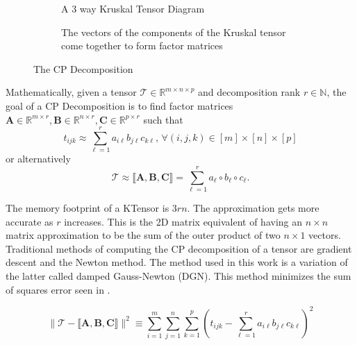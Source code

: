     \begin{figure}[ht!]
        \centering
        \begin{subfigure}[b]{0.99\textwidth}
            \centering
            
            \caption{A 3 way Kruskal Tensor Diagram}
            \label{fig:KTensor}
        \end{subfigure}
        
        \vspace{1em}
        \begin{subfigure}[b]{0.99\textwidth}
            \centering
            
            \caption[Kruskal Tensor Factor Matrices]{The vectors of the components of the Kruskal tensor come together to form factor matrices}
            \label{fig:KTensor_factor_matrices}
        \end{subfigure}
        \caption[The CP Decomposition]{The CP Decomposition}
    \end{figure}

    Mathematically, given a tensor $\mathcal{T} \in \mathbb{R}^{m\times n\times
    p}$ and decomposition rank $r\in \mathbb{N}$, the goal of a CP Decomposition
    is to find factor matrices $\mathbf{A}\in \mathbb{R}^{m\times r},
    \mathbf{B}\in \mathbb{R}^{n\times r}, \mathbf{C}\in \mathbb{R}^{p\times r}$
    such that \[ t_{ijk} \approx \sum_{\ell = 1}^{r} a_{i\ell}b_{j\ell}c_{k\ell}
    \text{, } \forall (i, j, k) \in [m]\times [n]\times [p] \] or alternatively
    \[ \mathcal{T} \approx \llbracket \mathbf{A, B, C} \rrbracket = \sum_{\ell =
    1}^{r} a_\ell \circ b_\ell \circ c_\ell.\]

    The memory footprint of a KTensor is $3rn$. The approximation gets more
    accurate as $r$ increases. This is the 2D matrix equivalent of having an
    $n\times n$ matrix approximation to be the sum of the outer product of two
    $n \times 1$ vectors. Traditional methods of computing the CP decomposition
    of a tensor are gradient descent and the Newton method. The method used in
    this work is a variation of the latter called damped Gauss-Newton (DGN).
    This method minimizes the sum of squares error seen in
    . 

    \begin{equation} \label{eq:cp_least_squares}
        \|\mathcal{T} - \llbracket \mathbf{A, B, C} \rrbracket \|^2 \equiv \sum_{i=1}^{m} \sum_{j=1}^{n} \sum_{k=1}^{p}\left(t_{ijk} - \sum_{\ell=1}^{r} a_{i\ell}b_{j\ell}c_{k\ell} \right)^2
    \end{equation}

